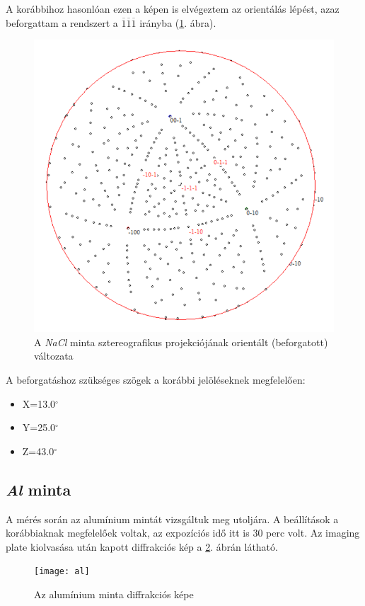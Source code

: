 \documentclass[12pt,a4paper]{article}
\begin{document}
A korábbihoz hasonlóan ezen a képen is elvégeztem az orientálás lépést, azaz beforgattam a rendszert a 
${\overline{1}\overline{1}\overline{1}}$ irányba (\ref{fig:nacl_oriented}. ábra).\\

\begin{figure}[!h]
\centering
\includegraphics[scale=1.4]{nacl_orient}
\caption{A \emph{NaCl} minta sztereografikus projekciójának orientált (beforgatott) változata}
\label{fig:nacl_oriented}
\end{figure}

A beforgatáshoz szükséges szögek a korábbi jelöléseknek megfelelően:
\begin{itemize}
\item{X=13.0$^{\circ}$}
\item{Y=25.0$^{\circ}$}
\item{Z=43.0$^{\circ}$}
\end{itemize}

\subsection{\emph{Al} minta}
\hspace*{10pt} A mérés során az alumínium mintát vizsgáltuk meg utoljára. A beállítások a korábbiaknak megfelelőek voltak, az expozíciós idő itt is 30 perc volt. Az imaging plate kiolvasása után kapott diffrakciós kép a \ref{fig:al}. ábrán látható.\\
\newpage
\begin{figure}
\centering
\texttt{[image: al]}
\caption{Az alumínium minta diffrakciós képe}
\label{fig:al}
\end{figure}
\end{document}
